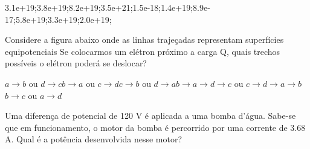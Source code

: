 \documentclass[12pt, addpoints]{exam}
\begin{document}
\begin{questions}
\begin{multicols*}{2}
\begin{oneparchoices}
\choice 3.1e+19;\choice 3.8e+19;\choice 8.2e+19;\choice 3.5e+21;\choice 1.5e-18;\choice 1.4e+19;\choice 8.9e-17;\choice 5.8e+19;\choice 3.3e+19;\choice 2.0e+19;\end{oneparchoices}
\question[20] Considere a figura abaixo onde as linhas trajeçadas representam superfícies equipotenciais Se colocarmos um elétron próximo a carga Q, quais trechos possíveis o elétron poderá se deslocar?
        
        \begin{center}
            \begin{minipage}[c]{0.5\linewidth}
            \end{minipage}
        \end{center}
        
        

\begin{choices}
\choice $a\rightarrow b$ ou $d\rightarrow c$\choice $b\rightarrow a$ ou $c\rightarrow d$\choice $c\rightarrow b$ ou $d\rightarrow a$\choice $b\rightarrow a\rightarrow d\rightarrow c$ ou $c\rightarrow d\rightarrow a\rightarrow b$\choice $b\rightarrow c$ ou $a\rightarrow d$\end{choices}
\question[20] Uma diferença de potencial de 120 V é aplicada a uma bomba d’água. Sabe-se que em funcionamento, o motor da bomba é percorrido por uma corrente de    3.68 A. Qual é a potência desenvolvida nesse motor?


\end{multicols*}
\end{questions}
\end{document}
